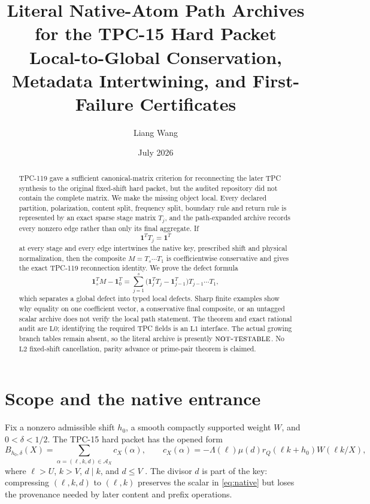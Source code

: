 \documentclass[11pt]{article}
\title{\textbf{Literal Native-Atom Path Archives for the TPC-15 Hard Packet}\\
\large Local-to-Global Conservation, Metadata Intertwining, and
First-Failure Certificates}
\author{Liang Wang}
\date{July 2026}
\theoremstyle{definition}
\theoremstyle{remark}
\newcommand{\cA}{\mathcal A}
\newcommand{\one}{\mathbf 1}
\newcommand{\Lzero}{\mathrm{L0}}
\newcommand{\Lone}{\mathrm{L1}}
\newcommand{\Ltwo}{\mathrm{L2}}
\newcommand{\NT}{\textsc{not-testable}}
\begin{document}
\maketitle

\begin{abstract}
TPC-119 gave a sufficient canonical-matrix criterion for reconnecting
the later TPC synthesis to the original fixed-shift hard packet, but
the audited repository did not contain the complete matrix.  We make
the missing object local.  Every declared partition, polarization,
content split, frequency split, boundary rule and return rule is
represented by an exact sparse stage matrix \(T_j\), and the
path-expanded archive records every nonzero edge rather than only its
final aggregate.  If
\[
 \one^TT_j=\one^T
\]
at every stage and every edge intertwines the native key, prescribed
shift and physical normalization, then the composite
\(M=T_s\cdots T_1\) is coefficientwise conservative and gives the
exact TPC-119 reconnection identity.  We prove the defect formula
\[
 \one_s^TM-\one_0^T
 =
 \sum_{j=1}^s
 \bigl(\one_j^TT_j-\one_{j-1}^T\bigr)
 T_{j-1}\cdots T_1,
\]
which separates a global defect into typed local defects.  Sharp
finite examples show why equality on one coefficient vector, a
conservative final composite, or an untagged scalar archive does not
verify the local path statement.  The theorem and exact rational
audit are \(\Lzero\); identifying the required TPC fields is an
\(\Lone\) interface.  The actual growing branch tables remain absent,
so the literal archive is presently \(\NT\).  No \(\Ltwo\)
fixed-shift cancellation, parity advance or prime-pair theorem is
claimed.
\end{abstract}

\section{Scope and the native entrance}

Fix a nonzero admissible shift \(h_0\), a smooth compactly supported
weight \(W\), and \(0<\delta<1/2\).  The TPC-15 hard packet has the
opened form
\begin{equation}
 B_{h_0,\delta}(X)
 =
 \sum_{\alpha=(\ell,k,d)\in\cA_X}c_X(\alpha),
 \qquad
 c_X(\alpha)=
 -\Lambda(\ell)\mu(d)r_Q(\ell k+h_0)W(\ell k/X),
 \label{eq:native}
\end{equation}
where \(\ell>U\), \(k>V\), \(d\mid k\), and \(d\le V\)
\citep{WangTPC15,WangTPC119}.  The divisor \(d\) is part of the key:
compressing \((\ell,k,d)\) to \((\ell,k)\) preserves the scalar in
\eqref{eq:native} but loses the provenance needed by later content
and prefix operations.
\end{document}
